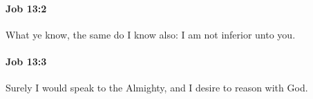 		\paragraph{Job 13:2} %
			\label{JOB-13-2}

			What ye know, the same do I know also: I am not inferior unto you.


		\paragraph{Job 13:3} %
			\label{JOB-13-3}

			Surely I would speak to the Almighty, and I desire to reason with God.



